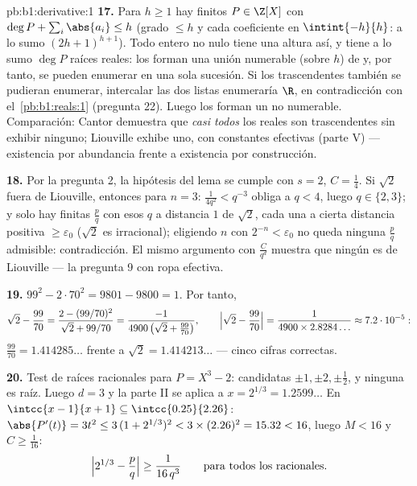 \begin{solution}{pb:b1:derivative:1}
\textbf{17.} Para $h \geq 1$ hay finitos $P \in \Z[X]$ con
$\deg P + \sum_i \abs{a_i} \leq h$ (grado $\leq h$ y cada
coeficiente en $\intint{-h}{h}$: a lo sumo $(2h+1)^{h+1}$). Todo
 entero no nulo tiene una altura así, y tiene a lo sumo
$\deg P$ raíces reales: los  forman una unión
numerable (sobre $h$) de  y, por tanto, se pueden
enumerar en una sola sucesión. Si los trascendentes también se
pudieran enumerar, intercalar las dos listas enumeraría $\R$, en
contradicción con el~\cref{pb:b1:reals:1} (pregunta 22). Luego los
 forman un  no numerable.
Comparación: Cantor demuestra que \emph{casi todos} los reales son
trascendentes sin exhibir ninguno; Liouville exhibe uno, con
constantes efectivas (parte V) --- existencia por abundancia frente a
existencia por construcción.

\textbf{18.} Por la pregunta 2, la hipótesis del lema se cumple con
$s = 2$, $C = \frac14$. Si $\sqrt2$ fuera de Liouville, entonces para
$n = 3$: $\frac{1}{4q^2} < q^{-3}$ obliga a $q < 4$, luego
$q \in \{2, 3\}$; y solo hay finitas $\frac pq$ con esos $q$ a
distancia $1$ de $\sqrt2$, cada una a cierta distancia positiva
$\geq \varepsilon_0$ ($\sqrt2$ es irracional); eligiendo $n$ con
$2^{-n} < \varepsilon_0$ no queda ninguna $\frac pq$ admisible:
contradicción. El mismo argumento con $\frac{C}{q^d}$ muestra que
ningún  es de Liouville --- la pregunta 9 con ropa
efectiva.

\textbf{19.} $99^2 - 2\cdot70^2 = 9801 - 9800 = 1$. Por tanto,
\[
\sqrt2 - \frac{99}{70} =
\frac{2 - (99/70)^2}{\sqrt2 + 99/70}
= \frac{-1}{4900\,\bigl(\sqrt2 + \tfrac{99}{70}\bigr)} ,
\qquad
\Bigl|\sqrt2 - \frac{99}{70}\Bigr|
= \frac{1}{4900 \times 2.8284\dots} \approx 7.2\cdot10^{-5} :
\]
$\frac{99}{70} = 1.414285\dots$ frente a
$\sqrt2 = 1.414213\dots$ --- cinco cifras correctas.

\textbf{20.} Test de raíces racionales para $P = X^3 - 2$:
candidatas $\pm1, \pm2, \pm\frac12$, y ninguna es raíz. Luego $d = 3$
y la parte II se aplica a $x = 2^{1/3} = 1.2599\dots$ En
$\intcc{x - 1}{x + 1} \subseteq \intcc{0.25}{2.26}$:
$\abs{P'(t)} = 3t^2 \leq 3\,(1 + 2^{1/3})^2 < 3\times(2.26)^2 =
15.32 < 16$, luego $M < 16$ y $C \geq \frac{1}{16}$:
\[
\Bigl|2^{1/3} - \frac pq\Bigr| \geq \frac{1}{16\,q^3}
\qquad\text{para todos los racionales.}
\]


\end{solution}
